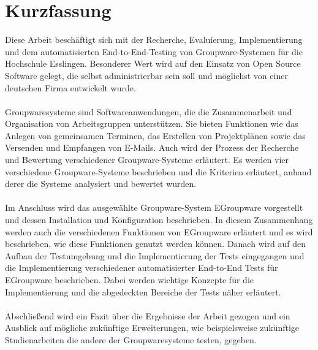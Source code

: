 \chapter{Kurzfassung}

Diese Arbeit beschäftigt sich mit der Recherche, Evaluierung, Implementierung und dem automatisierten End-to-End-Testing von Groupware-Systemen für die Hochschule Esslingen.
Besonderer Wert wird auf den Einsatz von Open Source Software gelegt, die selbst administrierbar sein soll und möglichst von einer deutschen Firma entwickelt wurde.
\\
\\
Groupwaresysteme sind Softwareanwendungen, die die Zusammenarbeit und Organisation von Arbeitsgruppen unterstützen.
Sie bieten Funktionen wie das Anlegen von gemeinsamen Terminen, das Erstellen von Projektplänen sowie das Versenden und Empfangen von E-Mails.
Auch wird der Prozess der Recherche und Bewertung verschiedener Groupware-Systeme erläutert.
Es werden vier verschiedene Groupware-Systeme beschrieben und die Kriterien erläutert, anhand derer die Systeme analysiert und bewertet wurden.
\\
\\
Im Anschluss wird das ausgewählte Groupware-System EGroupware vorgestellt und dessen Installation und Konfiguration beschrieben.
In diesem Zusammenhang werden auch die verschiedenen Funktionen von EGroupware erläutert und es wird beschrieben, wie diese Funktionen genutzt werden können.
Danach wird auf den Aufbau der Testumgebung und die Implementierung der Tests eingegangen und die Implementierung verschiedener automatisierter End-to-End Tests für EGroupware beschrieben.
Dabei werden wichtige Konzepte für die Implementierung und die abgedeckten Bereiche der Tests näher erläutert.
\\
\\
Abschließend wird ein Fazit über die Ergebnisse der Arbeit gezogen und ein Ausblick auf mögliche zukünftige Erweiterungen, wie beispielsweise zukünftige Studienarbeiten die andere der Groupwaresysteme testen, gegeben.